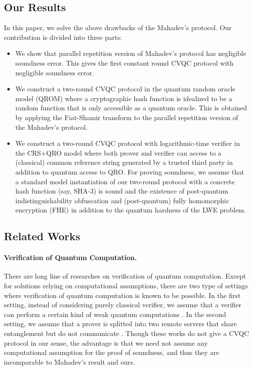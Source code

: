 \subsection{Our Results}
In this paper, we solve the above drawbacks of the Mahadev's protocol. 
Our contribution is divided into three parts:
\begin{itemize}
    \item We show that parallel repetition version of Mahadev's protocol has negligible soundness error. This gives the first constant round CVQC protocol with negligible soundness error.
    \item We construct a two-round CVQC protocol in the quantum random oracle model (QROM) \cite{AC:BDFLSZ11} where a cryptographic hash function is idealized to be a random function that is only accessible as a quantum oracle.
    This is obtained by applying the Fiat-Shamir transform \cite{C:FiaSha86,C:LiuZha19,C:DFMS19} to the parallel repetition version of the Mahadev's protocol.
    \item We construct a two-round CVQC protocol with logarithmic-time verifier in the CRS+QRO model where both prover and verifier can access to a (classical) common reference string generated by a trusted third party in addition to quantum access to QRO.
    For proving soundness, we assume that a standard model instantiation of our two-round protocol with a concrete hash function (say, SHA-3) is sound and the existence of post-quantum indistinguishability obfuscation \cite{JACM:BGIRSVY12,SIAM:GGH0SW16} and (post-quantum) fully homomorphic encryption (FHE) \cite{STOC:Gentry09} in addition to the quantum hardness of the LWE problem. 
\end{itemize}

\subsection{Related Works}
\paragraph{Verification of Quantum Computation.}
There are long line of researches on verification of quantum computation.
Except for solutions relying on computational assumptions, there are two type of settings where verification of quantum computation is known to be possible.
In the first setting, instead of considering purely classical verifier, we assume that a verifier can perform a certain kind of weak quantum computations \cite{FOCS:BroFitKas09,PR:FitKas17,arXiv:ABOEM17,PR:MorFit18}.
In the second setting, we assume that a prover is splitted into two remote servers that share entanglement but do not communicate \cite{Nat:RUV13}.
Though these works do not give a CVQC protocol in our sense, the advantage is that we need not assume any computational assumption for the proof of soundness, and thus they are incomparable to Mahadev's result and ours.

